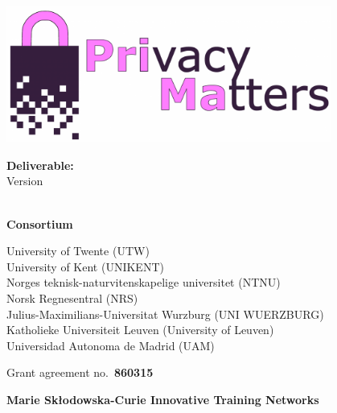 \begin{center}

  \begin{center}
  \includegraphics[width=0.8\textwidth]{images/PriMa.png}
  \vspace{10mm}
  \end{center}

  \textbf{\Large Deliverable: \DelNumber} \\\vspace{5mm} 
  {\large Version \DelVersion}\\\vspace{10mm}
  \textbf{\Huge \DelTitle}\\\vspace{20mm}
  
  \textbf{Consortium}\\\vspace{5mm}
  
  University of Twente (UTW)\\
  University of Kent (UNIKENT)\\
  Norges teknisk-naturvitenskapelige universitet (NTNU)\\
  Norsk Regnesentral (NRS)\\
  Julius-Maximilians-Universitat Wurzburg (UNI WUERZBURG)\\
  Katholieke Universiteit Leuven (University of Leuven)\\
  Universidad Autonoma de Madrid (UAM)\\\vspace{20mm}

  Grant agreement no.\ \textbf{860315}\\\vspace{20mm}

  \textbf{Marie Skłodowska-Curie Innovative Training Networks}\\\vspace{20mm}
  \strut

  \vspace*{\fill}




\end{center}
